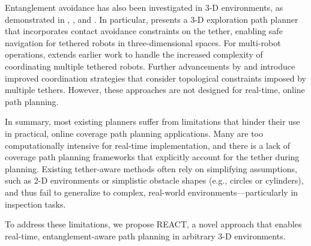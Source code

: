Entanglement avoidance has also been investigated in 3-D environments, as demonstrated in \cite{petit2022tape}, \cite{martinez2021optimization}, and \cite{bhattacharya2012topological}. In particular, \cite{petit2022tape} presents a 3-D exploration path planner that incorporates contact avoidance constraints on the tether, enabling safe navigation for tethered robots in three-dimensional spaces. For multi-robot operations, \cite{hert1999motion} extends earlier work to handle the increased complexity of coordinating multiple tethered robots. Further advancements by \cite{patil2023coordinating} and \cite{cao2023path} introduce improved coordination strategies that consider topological constraints imposed by multiple tethers. However, these approaches are not designed for real-time, online path planning.

In summary, most existing planners suffer from limitations that hinder their use in practical, online coverage path planning applications. Many are too computationally intensive for real-time implementation, and there is a lack of coverage path planning frameworks that explicitly account for the tether during planning. Existing tether-aware methods often rely on simplifying assumptions, such as 2-D environments or simplistic obstacle shapes (e.g., circles or cylinders), and thus fail to generalize to complex, real-world environments—particularly in inspection tasks.

To address these limitations, we propose \ac{REACT}, a novel approach that enables real-time, entanglement-aware path planning in arbitrary 3-D environments.














